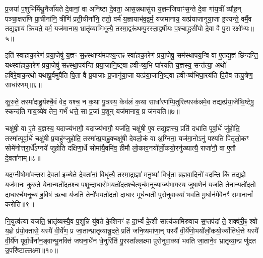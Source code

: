 प्र॒जया॑ प॒शुभि॑र्मिथु॒नैर्जा॑यते दे॒वानां॒ वा अनि॑ष्टा दे॒वता॒ आस॒न्नथासु॑रा य॒ज्ञम॑जिघाꣳस॒न्ते दे॒वा गा॑य॒त्रीं व्यौ॑ह॒न् पञ्चा॒क्षरा॑णि प्रा॒चीना॑नि॒ त्रीणि॑ प्रती॒चीना॑नि॒ ततो॒ वर्म॑ य॒ज्ञायाभ॑व॒द्वर्म॒ यज॑मानाय॒ यत्प्र॑याजानूया॒जा इ॒ज्यन्ते॒ वर्मै॒व तद्य॒ज्ञाय॑ क्रियते॒ वर्म॒ यज॑मानाय॒ भ्रातृ॑व्याभिभूत्यै॒ तस्मा॒द्वरू॑थम्पु॒रस्ता॒द्वर्\mbox{}षी॑यः प॒श्चाद्ध्रसी॑यो दे॒वा वै पु॒रा रक्षो᳚भ्यः॥५॥

इति॑ स्वाहाका॒रेण॑ प्रया॒जेषु॑ य॒ज्ञꣳ स॒ꣴ॒स्थाप्य॑मपश्य॒न्तꣴ स्वा॑हाका॒रेण॑ प्रया॒जेषु॒ सम॑स्थापय॒न्वि वा ए॒तद्य॒ज्ञं छि॑न्दन्ति॒ यथ्स्वा॑हाका॒रेण॑ प्रया॒जेषु॑ सꣴस्था॒पय॑न्ति प्रया॒जानि॒ष्ट्वा ह॒वीꣳष्य॒भि घा॑रयति य॒ज्ञस्य॒ सन्त॑त्या॒ अथो॑ ह॒विरे॒वाक॒रथो॑ यथापू॒र्वमुपै॑ति पि॒ता वै प्र॒याजाः प्र॒जानू॑या॒जा यत्प्र॑या॒जानि॒ष्ट्वा ह॒वीꣳष्य॑भिघा॒रय॑ति पि॒तैव तत्पु॒त्रेण॒ साधा॑रणम्॥६॥

कु॒रु॒ते॒ तस्मा॑दाहु॒र्यश्चै॒वं वेद॒ यश्च॒ न क॒था पु॒त्रस्य॒ केव॑लं क॒था साधा॑रणम्पि॒तुरित्यस्क॑न्नमे॒व तद्यत्प्र॑या॒जेष्वि॒ष्टेषु॒ स्कन्द॑ति गाय॒त्र्ये॑व तेन॒ गर्भं॑ धत्ते॒ सा प्र॒जां प॒शून् यज॑मानाय॒ प्र ज॑नयति॥७॥

{}

चक्षु॑षी॒ वा ए॒ते य॒ज्ञस्य॒ यदाज्य॑भागौ॒ यदाज्य॑भागौ॒ यज॑ति॒ चक्षु॑षी ए॒व तद्य॒ज्ञस्य॒ प्रति॑ दधाति पूर्वा॒र्धे जु॑होति॒ तस्मा᳚त्पूर्वा॒र्धे चक्षु॑षी प्र॒बाहु॑ग्जुहोति॒ तस्मा᳚त्प्र॒बाहु॒क्चक्षु॑षी देवलो॒कं वा अ॒ग्निना॒ यज॑मा॒नो\-ऽनु॑ पश्यति पितृलो॒कꣳ सोमे॑नोत्तरा॒र्धे᳚\-ऽग्नये॑ जुहोति दक्षिणा॒र्धे सोमा॑यै॒वमि॑व॒ हीमौ लो॒काव॒नयो᳚र्लो॒कयो॒रनु॑ख्यात्यै॒ राजा॑नौ॒ वा ए॒तौ दे॒वता॑नाम्॥८॥

यद॒ग्नीषोमा॑वन्त॒रा दे॒वता॑ इज्येते दे॒वता॑नां॒ विधृ॑त्यै॒ तस्मा॒द्राज्ञा॑ मनु॒ष्या॑ विधृ॑ता ब्रह्मवा॒दिनो॑ वदन्ति॒ किं तद्य॒ज्ञे यज॑मानः कुरुते॒ येना॒न्यतो॑दतश्च प॒शून्दा॒धारो॑भ॒यतो॑दत॒श्चेत्यृच॑म॒नूच्याज्य॑भागस्य जुषा॒णेन॑ यजति॒ तेना॒न्यतो॑दतो दाधा॒रर्च॑म॒नूच्य॑ ह॒विष॑ ऋ॒चा य॑जति॒ तेनो॑भ॒यतो॑दतो दाधार मूर्ध॒न्वती॑ पुरोनुवा॒क्या॑ भवति मू॒र्धान॑मे॒वैनꣳ॑ समा॒नानां᳚ करोति॥९॥

नि॒युत्व॑त्या यजति॒ भ्रातृ॑व्यस्यै॒व प॒शून्नि यु॑वते के॒शिनꣳ॑ ह दा॒र्भ्यं के॒शी सात्य॑कामिरुवाच स॒प्तप॑दां ते॒ शक्व॑री॒ꣴ॒ श्वो य॒ज्ञे प्र॑यो॒क्तासे॒ यस्यै॑ वी॒र्ये॑ण॒ प्र जा॒तान्भ्रातृ॑व्यान्नु॒दते॒ प्रति॑ जनि॒ष्यमा॑णा॒न् यस्यै॑ वी॒र्ये॑णो॒भयो᳚र्लो॒कयो॒र्ज्योति॑र्ध॒त्ते यस्यै॑ वी॒र्ये॑ण पूर्वा॒र्धेना॑न॒ड्वान्भु॒नक्ति॑ जघना॒र्धेन॑ धे॒नुरिति॑ पु॒रस्ता᳚ल्लक्ष्मा पुरोनुवा॒क्या॑ भवति जा॒ताने॒व भ्रातृ॑व्या॒न्प्र णु॑दत उ॒परि॑ष्टाल्लक्ष्मा॥१०॥

